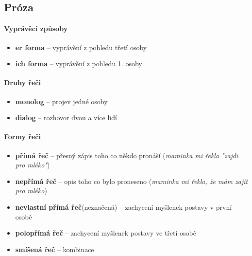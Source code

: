 \subsection{Próza}
\paragraph{Vyprávěcí způsoby}
\begin{itemize}
\item[] \textbf{er forma} -- vyprávění z pohledu třetí osoby
\item[] \textbf{ich forma} -- vyprávění z pohledu 1. osoby
\end{itemize}

\paragraph{Druhy řeči}
\begin{itemize}
\item[] \textbf{monolog} -- projev jedné osoby
\item[] \textbf{dialog} -- rozhovor dvou a více lidí
\end{itemize}

\paragraph{Formy řeči}
\begin{itemize}
\item[] \textbf{přímá řeč} -- přesný zápis toho co někdo pronáší (\textit{maminka mi řekla "zajdi pro mléko"})
\item[] \textbf{nepřímá řeč} -- opis toho co bylo proneseno (\textit{maminka mi řekla, že mám zajít pro mléko})
\item[] \textbf{nevlastní přímá řeč}(neznačená) -- zachycení myšlenek postavy v první osobě
\item[] \textbf{polopřímá řeč} -- zachycení myšlenek postavy ve třetí osobě
\item[] \textbf{smíšená řeč} -- kombinace
\end{itemize}



